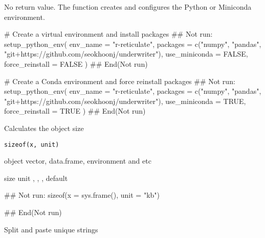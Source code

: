 \documentclass[letterpaper]{book}
\begin{document}
%
\begin{Value}
No return value. The function creates and configures the Python or Miniconda environment.
\end{Value}
%
\begin{Examples}
\begin{ExampleCode}
# Create a virtual environment and install packages
## Not run: setup_python_env(
  env_name = "r-reticulate",
  packages = c("numpy", "pandas", "git+https://github.com/seokhoonj/underwriter"),
  use_miniconda = FALSE,
  force_reinstall = FALSE
)
## End(Not run)

# Create a Conda environment and force reinstall packages
## Not run: setup_python_env(
  env_name = "r-reticulate",
  packages = c("numpy", "pandas", "git+https://github.com/seokhoonj/underwriter"),
  use_miniconda = TRUE,
  force_reinstall = TRUE
)
## End(Not run)

\end{ExampleCode}
\end{Examples}
%
\begin{Description}
Calculates the object size
\end{Description}
%
\begin{Usage}
\begin{verbatim}
sizeof(x, unit)
\end{verbatim}
\end{Usage}
%
\begin{Arguments}
\begin{ldescription}
\item[\code{x}] object vector, data.frame, environment and etc

\item[\code{unit}] size unit , , ,  default 
\end{ldescription}
\end{Arguments}
%
\begin{Examples}
\begin{ExampleCode}
## Not run: 
sizeof(x = sys.frame(), unit = "kb")

## End(Not run)
\end{ExampleCode}
\end{Examples}
%
\begin{Description}
Split and paste unique strings
\end{Description}
\end{document}
